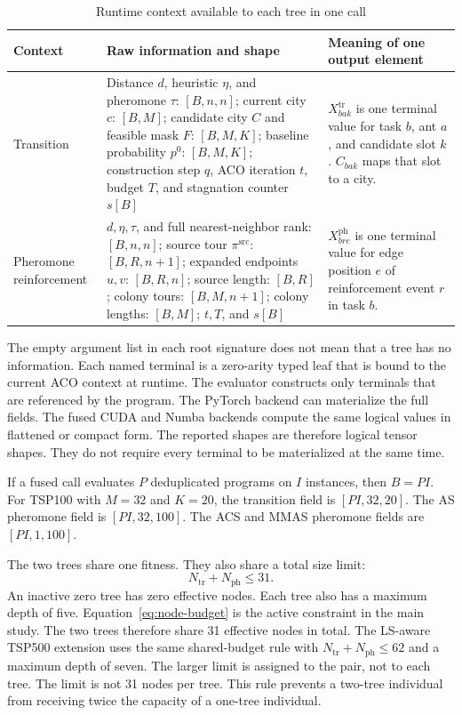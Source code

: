 \documentclass[letterpaper,journal]{IEEEtran}
\begin{document}
\begin{table}[t]
\caption{Runtime context available to each tree in one call}
\label{tab:runtime-context}
\centering
\footnotesize
\renewcommand{\arraystretch}{1.15}
\setlength{\tabcolsep}{4pt}
\begin{tabular}{L{28mm}L{73mm}L{67mm}}
\toprule
Context & Raw information and shape & Meaning of one output element\\
\midrule
Transition &
Distance \(d\), heuristic \(\eta\), and pheromone \(\tau\):
\([B,n,n]\);
current city \(c\): \([B,M]\);
candidate city \(C\) and feasible mask \(F\): \([B,M,K]\);
baseline probability \(p^0\): \([B,M,K]\);
construction step \(q\), ACO iteration \(t\), budget \(T\), and
stagnation counter \(s[B]\) &
\(X^{\mathrm{tr}}_{bak}\) is one terminal value for task \(b\), ant \(a\),
and candidate slot \(k\).
\(C_{bak}\) maps that slot to a city.\\
Pheromone reinforcement &
\(d,\eta,\tau\), and full nearest-neighbor rank: \([B,n,n]\);
source tour \(\pi^{\mathrm{src}}\): \([B,R,n+1]\);
expanded endpoints \(u,v\): \([B,R,n]\);
source length: \([B,R]\);
colony tours: \([B,M,n+1]\);
colony lengths: \([B,M]\);
\(t,T\), and \(s[B]\) &
\(X^{\mathrm{ph}}_{bre}\) is one terminal value for edge position \(e\)
of reinforcement event \(r\) in task \(b\).\\
\bottomrule
\end{tabular}
\end{table}

The empty argument list in each root signature does not mean that a tree has
no information.
Each named terminal is a zero-arity typed leaf that is bound to the current
ACO context at runtime.
The evaluator constructs only terminals that are referenced by the program.
The PyTorch backend can materialize the full fields.
The fused CUDA and Numba backends compute the same logical values in flattened
or compact form.
The reported shapes are therefore logical tensor shapes.
They do not require every terminal to be materialized at the same time.

If a fused call evaluates \(P\) deduplicated programs on \(I\) instances,
then \(B=PI\).
For TSP100 with \(M=32\) and \(K=20\), the transition field is
\([PI,32,20]\).
The AS pheromone field is \([PI,32,100]\).
The ACS and MMAS pheromone fields are \([PI,1,100]\).

The two trees share one fitness.
They also share a total size limit:
\begin{equation}
    N_{\mathrm{tr}}+N_{\mathrm{ph}}\leq 31.
    \label{eq:node-budget}
\end{equation}
An inactive zero tree has zero effective nodes.
Each tree also has a maximum depth of five.
Equation~\eqref{eq:node-budget} is the active constraint in the main study.
The two trees therefore share 31 effective nodes in total.
The LS-aware TSP500 extension uses the same shared-budget rule with
\(N_{\mathrm{tr}}+N_{\mathrm{ph}}\leq62\) and a maximum depth of seven.
The larger limit is assigned to the pair, not to each tree.
The limit is not 31 nodes per tree.
This rule prevents a two-tree individual from receiving twice the capacity
of a one-tree individual.
\end{document}
